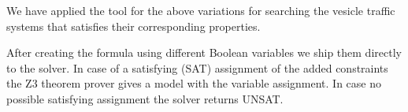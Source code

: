 We have applied the tool for the above variations for searching the vesicle traffic systems that satisfies
their corresponding properties. 

% 

After creating the formula using different Boolean variables we ship them directly to the solver. In case of a satisfying (SAT) assignment of the added constraints the Z3 theorem prover gives a model with the variable assignment. In case no possible satisfying assignment the solver returns UNSAT.
%
%






